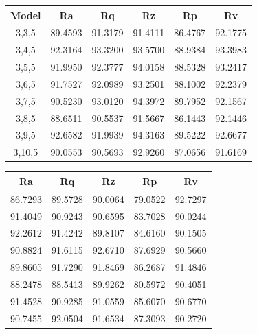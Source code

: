 \documentclass[suppldata]{interact}
\begin{document}
    \hfill
    \begin{minipage}{0.40\textwidth}
   \small
\centering
      \begin{tabular}{|c|c|c|c|c|c|}
    \hline
         Model & Ra &  Rq &  Rz &  Rp & Rv \\ \hline
         3,3,5 &89.4593 & 91.3179 & 91.4111 & 86.4767 & 92.1775 \\ \hline
         3,4,5 &92.3164 & 93.3200 & 93.5700 & 88.9384 & 93.3983 \\ \hline
        3,5,5 & 91.9950 & 92.3777 & 94.0158 & 88.5328 & 93.2417 \\ \hline
         3,6,5 &91.7527 & 92.0989 & 93.2501 & 88.1002 & 92.2379 \\ \hline
        3,7,5 & 90.5230 & 93.0120 & 94.3972 & 89.7952 & 92.1567 \\ \hline
         3,8,5 &88.6511 & 90.5537 & 91.5667 & 86.1443 & 92.1446 \\ \hline
        3,9,5 & 92.6582 & 91.9939 & 94.3163 & 89.5222 & 92.6677 \\ \hline
         3,10,5 &90.0553 & 90.5693 & 92.9260 & 87.0656 & 91.6169 \\ \hline
    \end{tabular}
        \label{tab:lmmapetr}
    \end{minipage}
    \hfill 
     \begin{minipage}{0.33\textwidth}
   \small
{}
     \begin{tabular}{|c|c|c|c|c|}
    \hline
         Ra &  Rq &  Rz &  Rp & Rv \\ \hline
        86.7293 & 89.5728 & 90.0064 & 79.0522 & 92.7297 \\ \hline
        91.4049 & 90.9243 & 90.6595 & 83.7028 & 90.0244 \\ \hline
        92.2612 & 91.4242 & 89.8107 & 84.6160 & 90.1505 \\ \hline
        90.8824 & 91.6115 & 92.6710 & 87.6929 & 90.5660 \\ \hline
        89.8605 & 91.7290 & 91.8469 & 86.2687 & 91.4846 \\ \hline
        88.2478 & 88.5413 & 89.9262 & 80.5972 & 90.4051 \\ \hline
        91.4528 & 90.9285 & 91.0559 & 85.6070 & 90.6770 \\ \hline
        90.7455 & 92.0504 & 91.6534 & 87.3093 & 90.2720 \\ \hline
    \end{tabular}
        \label{tab:lmmapete}
    \end{minipage}
\end{document}
